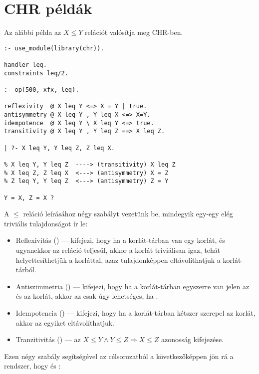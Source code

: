 \section{CHR példák}

Az alábbi példa az $X \leq Y$ relációt valósítja meg CHR-ben.
\begin{verbatim}
:- use_module(library(chr)).

handler leq.
constraints leq/2.

:- op(500, xfx, leq).

reflexivity  @ X leq Y <=> X = Y | true.
antisymmetry @ X leq Y , Y leq X <=> X=Y.
idempotence  @ X leq Y \ X leq Y <=> true.
transitivity @ X leq Y , Y leq Z ==> X leq Z.

| ?- X leq Y, Y leq Z, Z leq X.

% X leq Y, Y leq Z  ----> (transitivity) X leq Z
% X leq Z, Z leq X  <---> (antisymmetry) X = Z
% Z leq Y, Y leq Z  <---> (antisymmetry) Z = Y

Y = X, Z = X ? 
\end{verbatim}

A $\leq$ reláció leírásához négy szabályt vezetünk be, mindegyik egy-egy elég
triviális tulajdonságot ír le:

\begin{itemize}
\item Reflexivitás () --- kifejezi, hogy ha a korlát-tárban van
egy  korlát, és ugyanekkor az  reláció teljesül, akkor
a korlát triviálisan igaz, tehát helyettesíthetjük a  korláttal, azaz
tulajdonképpen eltávolíthatjuk a korlát-tárból.

\item Antiszimmetria () --- kifejezi, hogy ha a korlát-tárban
egyszerre van jelen az  és az  korlát, akkor az csak úgy
lehetséges, ha .

\item Idempotencia () --- kifejezi, hogy ha a korlát-tárban
kétszer szerepel az  korlát, akkor az egyiket eltávolíthatjuk.

\item Tranzitivitás () --- az
$X \leq Y \wedge Y \leq Z \Longrightarrow X \leq Z$ azonosság kifejezése.
\end{itemize}

Ezen négy szabály segítségével az  célsorozatból
a következőképpen jön rá a rendszer, hogy  és :

